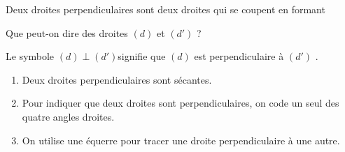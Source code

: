 \documentclass[a4paper,10pt]{report}
\begin{document}
\begin{defn}
Deux droites perpendiculaires sont deux droites qui se coupent en formant\dotfill

\medskip \noindent \dotfill
\end{defn}

\begin{ex}
Que peut-on dire des droites $(d)$ et $(d')$ ?

\medskip
\noindent \begin{minipage}{5.5cm}
\end{minipage}
\hspace{5mm}
\begin{minipage}{10.5cm}
\noindent\grandscarreaux{\linewidth}{3.8cm}
\end{minipage}
\end{ex}

\begin{prop}
Le symbole $(d)\perp(d')$signifie que \og $(d)$ est perpendiculaire à $(d')$ \fg{}.
\end{prop}

\begin{rem}
\begin{enumerate}
\item[•] Deux droites perpendiculaires sont sécantes.
\item[•] Pour indiquer que deux droites sont perpendiculaires, on code un seul des quatre angles droites.
\item[•] On utilise une équerre pour tracer une droite perpendiculaire à une autre.
\end{enumerate} 
\end{rem}
\end{document}
